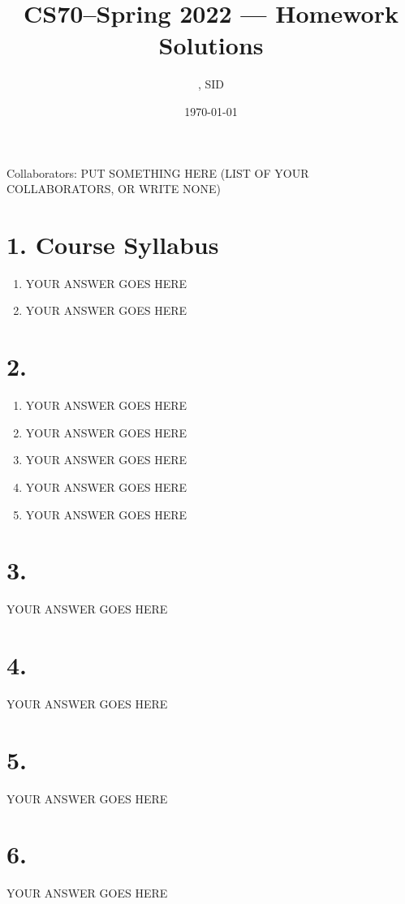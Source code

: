 \documentclass[11pt]{article}
\title{CS70--Spring 2022 --- Homework \Homework Solutions}
\author{\Name, SID \SID}
\date{\today}
\newenvironment{qparts}{\begin{enumerate}[{(}a{)}]}{\end{enumerate}}
\begin{document}
\maketitle

Collaborators: PUT SOMETHING HERE (LIST OF YOUR COLLABORATORS, OR WRITE NONE)

\section*{1. Course Syllabus}
\begin{qparts}
\item
YOUR ANSWER GOES HERE

\item
YOUR ANSWER GOES HERE

\end{qparts}



\newpage
\section*{2.}
\begin{qparts}
\item
YOUR ANSWER GOES HERE

\item
YOUR ANSWER GOES HERE

\item
YOUR ANSWER GOES HERE

\item
YOUR ANSWER GOES HERE

\item
YOUR ANSWER GOES HERE

\end{qparts}


\newpage
\section*{3.}
YOUR ANSWER GOES HERE


\newpage
\section*{4.}
YOUR ANSWER GOES HERE


\newpage
\section*{5.}
YOUR ANSWER GOES HERE


\newpage
\section*{6.}
YOUR ANSWER GOES HERE
\end{document}
